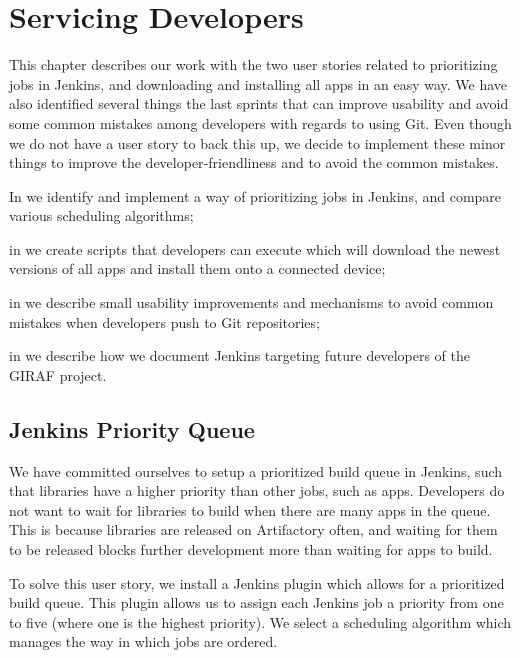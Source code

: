 \chapter{Servicing Developers}
This chapter describes our work with the two user stories related to prioritizing jobs in Jenkins, and downloading and installing all apps in an easy way. We have also identified several things the last sprints that can improve usability and avoid some common mistakes among developers with regards to using Git. Even though we do not have a user story to back this up, we decide to implement these minor things to improve the developer-friendliness and to avoid the common mistakes.

\begin{chapterorganization}
  \item In  we identify and implement a way of prioritizing jobs in Jenkins, and compare various scheduling algorithms;
  \item in  we create scripts that developers can execute which will download the newest versions of all apps and install them onto a connected device;
  \item in  we describe small usability improvements and mechanisms to avoid common mistakes when developers push to Git repositories;
  \item in  we describe how we document Jenkins targeting future developers of the GIRAF project.
\end{chapterorganization}

\section{Jenkins Priority Queue}\label{sec:jenkins_prio_queue}
We have committed ourselves to setup a prioritized build queue in Jenkins, such that libraries have a higher priority than other jobs, such as apps. Developers do not want to wait for libraries to build when there are many apps in the queue. This is because libraries are released on Artifactory often, and waiting for them to be released blocks further development more than waiting for apps to build.

To solve this user story, we install a Jenkins plugin \parencite{jenkins-priority-plugin} which allows for a prioritized build queue. This plugin allows us to assign each Jenkins job a priority from one to five (where one is the highest priority). We select a scheduling algorithm which manages the way in which jobs are ordered.

